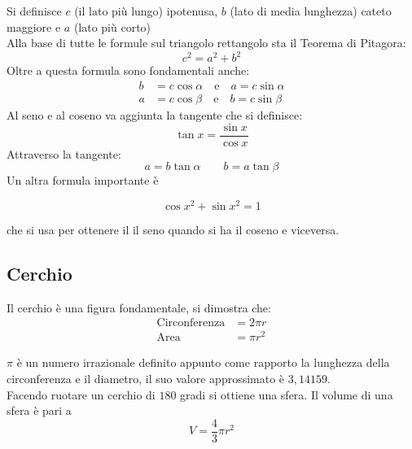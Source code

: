 \begin{center}     
\end{center}
Si definisce $c$ (il lato più lungo) ipotenusa, $b$ (lato di media lunghezza) cateto maggiore e
$a$ (lato più corto)\\
Alla base di tutte le formule sul triangolo rettangolo sta il Teorema di Pitagora:
\begin{equation*}
c^2=a^2+b^2
\end{equation*}
Oltre a questa formula sono fondamentali anche:
\begin{align*}
	b&=c\cos\alpha\quad\text{e}\quad a=c\sin\alpha\\
	a&=c\cos\beta\quad\text{e}\quad b=c\sin\beta
\end{align*}
Al seno e al coseno va aggiunta la tangente che si definisce:
\begin{equation*}
\tan x = \frac{\sin x}{\cos x}
\end{equation*}
Attraverso la tangente:
\begin{equation*}
a=b\tan\alpha \qquad
b=a \tan\beta
\end{equation*}  
Un altra formula importante è
\vspace{-0.5cm}
\begin{center}
\begin{equation*}
\cos{x}^{2}+\sin{x}^{2}=1 
\end{equation*}
\end{center}
che si usa per ottenere il il seno quando si ha il coseno e viceversa.
\subsection{Cerchio}

Il cerchio è una figura fondamentale, si dimostra che: 
\begin{align*}
\text{Circonferenza}&=2\pi r\\
\text{Area}&=\pi r^2
\end{align*}

\begin{center}     
\end{center}
$\pi$ è un numero irrazionale definito appunto come rapporto la lunghezza della circonferenza e il 
diametro, il suo valore approssimato è $3,14159$. \\	
Facendo ruotare un cerchio di $180$ gradi si ottiene una sfera. Il volume di una sfera è pari a
\begin{equation*}
V=\frac{4}{3}\pi r^{2}
\end{equation*}

